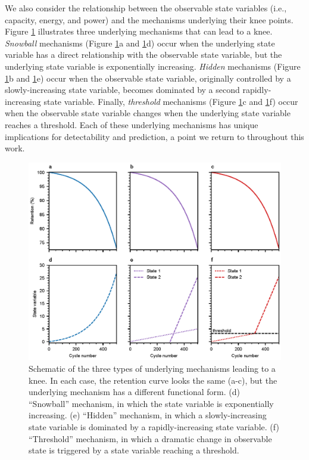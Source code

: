 \documentclass[journal=jpcl, manuscript=article, layout=onecolumn]{achemso}
\begin{document}
We also consider the relationship between the observable state variables (i.e., capacity, energy, and power) and the mechanisms underlying their knee points. Figure \ref{fig:snowball_vs_hidden_vs_threshold} illustrates three underlying mechanisms that can lead to a knee. \textit{Snowball} mechanisms (Figure \ref{fig:snowball_vs_hidden_vs_threshold}a and \ref{fig:snowball_vs_hidden_vs_threshold}d) occur when the underlying state variable has a direct relationship with the observable state variable, but the underlying state variable is exponentially increasing. \textit{Hidden} mechanisms (Figure \ref{fig:snowball_vs_hidden_vs_threshold}b and \ref{fig:snowball_vs_hidden_vs_threshold}e) occur when the observable state variable, originally controlled by a slowly-increasing state variable, becomes dominated by a second rapidly-increasing state variable. Finally, \textit{threshold} mechanisms (Figure \ref{fig:snowball_vs_hidden_vs_threshold}c and \ref{fig:snowball_vs_hidden_vs_threshold}f) occur when the observable state variable changes when the underlying state variable reaches a threshold. Each of these underlying mechanisms has unique implications for detectability and prediction, a point we return to throughout this work.

\begin{figure}[h]
    \centering
    \includegraphics[width=0.7\linewidth]{figures/snowball_vs_hidden_mechanism.eps}
    \caption{Schematic of the three types of underlying mechanisms leading to a knee. In each case, the retention curve looks the same (a-c), but the underlying mechanism has a different functional form. (d) ``Snowball'' mechanism, in which the state variable is exponentially increasing. (e) ``Hidden'' mechanism, in which a slowly-increasing state variable is dominated by a rapidly-increasing state variable. (f) ``Threshold'' mechanism, in which a dramatic change in observable state is triggered by a state variable reaching a threshold.}
    \label{fig:snowball_vs_hidden_vs_threshold}
\end{figure}
\end{document}
